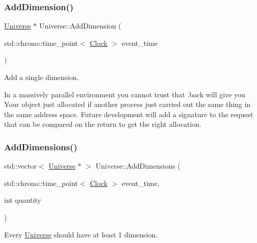 \mbox{\label{classUniverse_a6326158c47bf3f7fe9297299a9b5b7b7}} 
\subsubsection{\texorpdfstring{Add\+Dimension()}{AddDimension()}}
{\footnotesize\ttfamily \mbox{\hyperlink{classUniverse}{Universe}} $\ast$ Universe\+::\+Add\+Dimension (\begin{DoxyParamCaption}\item[{std\+::chrono\+::time\+\_\+point$<$ \mbox{\hyperlink{universe_8h_a0ef8d951d1ca5ab3cfaf7ab4c7a6fd80}{Clock}} $>$}]{event\+\_\+time }\end{DoxyParamCaption})}

Add a single dimension.

In a massively parallel environment you cannot trust that .back will give you Your object just allocated if another process just carried out the same thing in the same address space. Future development will add a signature to the request that can be compared on the return to get the right allocation.\mbox{\label{classUniverse_a03bdf5f7fea4209241e9bf5316d45517}} 
\subsubsection{\texorpdfstring{Add\+Dimensions()}{AddDimensions()}}
{\footnotesize\ttfamily std\+::vector$<$ \mbox{\hyperlink{classUniverse}{Universe}} $\ast$ $>$ Universe\+::\+Add\+Dimensions (\begin{DoxyParamCaption}\item[{std\+::chrono\+::time\+\_\+point$<$ \mbox{\hyperlink{universe_8h_a0ef8d951d1ca5ab3cfaf7ab4c7a6fd80}{Clock}} $>$}]{event\+\_\+time,  }\item[{int}]{quantity }\end{DoxyParamCaption})}

Every \mbox{\hyperlink{classUniverse}{Universe}} should have at least 1 dimension.\mbox{\label{classUniverse_a90c573dec55f2b3ad5680015356f5f25}} 

